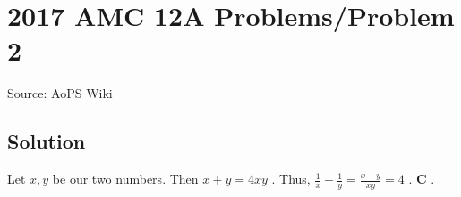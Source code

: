 \documentclass[12pt]{article}
\begin{document}
\section*{{2017 AMC 12A Problems/Problem 2}}
Source: AoPS Wiki

\subsection*{Solution}
Let $x, y$ be our two numbers. Then $x+y = 4xy$ . Thus, $\frac{1}{x} + \frac{1}{y} = \frac{x+y}{xy} = 4$ . $\boxed{ \textbf{C}}$ .
\end{document}
